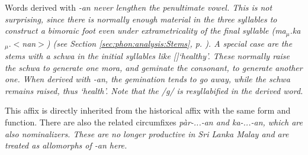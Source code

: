 Words derived with \em -an \em never lengthen the penultimate vowel. This is not surprising, since there is normally enough material in the three syllables to construct a bimoraic foot even under extrametricality of the final syllable (ma$_{\mu}$.ka$_{\mu}.<$nan$>$) (see Section \ref{sec:phon:analysis:Stems}, p. \pageref{sec:phon:analysis:Stems}). A special case are the stems with a schwa in the initial syllables like []`healthy'. These normally raise the schwa to generate one mora, and geminate the consonant, to generate another one. When derived with \em -an\em, the gemination tends to go away, while the schwa remains raised, thus `health'. Note that the /g/ is resyllabified in the derived word.
% 
% 
% 
% 
% 

This affix is directly inherited from the historical affix with the same form and function. There are also the related circumfixes \em pàr-...-an \em and \em ka-...-an\em, which are also nominalizers. These are no longer productive in Sri Lanka Malay and are treated as allomorphs of \em -an \em here.



